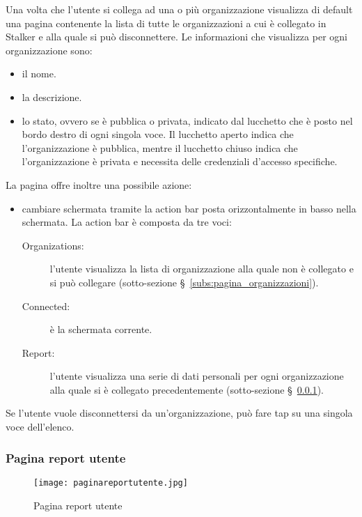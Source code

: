 \documentclass[../manuale-utente.tex]{subfiles}
\begin{document}
 Una volta che l'utente si collega ad una o più organizzazione visualizza di default una pagina contenente la lista di tutte le organizzazioni a cui è collegato in Stalker e alla quale si può disconnettere.
 Le informazioni che visualizza per ogni organizzazione sono:
 \begin{itemize}
   \item il nome.
   \item la descrizione.
   \item lo stato, ovvero se è pubblica o privata, indicato dal lucchetto che è posto nel bordo destro di ogni singola voce. Il lucchetto aperto indica che l'organizzazione è pubblica, mentre il lucchetto chiuso indica che l'organizzazione è privata e necessita delle credenziali d'accesso specifiche.
 \end{itemize}
 La pagina offre inoltre una possibile azione:
 \begin{itemize}
   \item cambiare schermata tramite la action bar posta orizzontalmente in basso nella schermata. La action bar è composta da tre voci:
   \begin{description}
     \item[Organizations:] l'utente visualizza la lista di organizzazione alla quale non è collegato e si può collegare (sotto-sezione §~\ref{subs:pagina_organizzazioni}).
     \item[Connected:] è la schermata corrente.
     \item[Report:] l'utente visualizza una serie di dati personali per ogni organizzazione alla quale si è collegato precedentemente (sotto-sezione §~\ref{subs:pagina_report_utente}).
   \end{description}
 \end{itemize}
 Se l'utente vuole disconnettersi da un'organizzazione, può fare tap su una singola voce dell'elenco.

\subsubsection{Pagina report utente}%
\label{subs:pagina_report_utente}

 \begin{figure}[H]
   \centering
   \texttt{[image: paginareportutente.jpg]}
   \caption{Pagina report utente}%
   \label{fig:mobile_app_pagina_report_utente}
 \end{figure}
\end{document}
